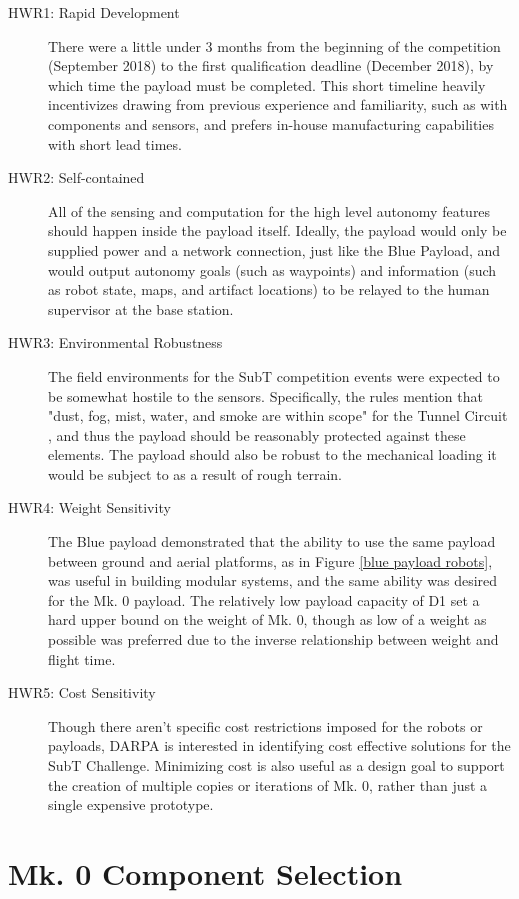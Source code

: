 \begin{description}
	\item[HWR1: Rapid Development] There were a little under 3 months from the beginning of the competition (September 2018) to the first qualification deadline (December 2018), by which time the payload must be completed. This short timeline heavily incentivizes drawing from previous experience and familiarity, such as with components and sensors, and prefers in-house manufacturing capabilities with short lead times.
	\item[HWR2: Self-contained] All of the sensing and computation for the high level autonomy features should happen inside the payload itself. Ideally, the payload would only be supplied power and a network connection, just like the Blue Payload, and would output autonomy goals (such as waypoints) and information (such as robot state, maps, and artifact locations) to be relayed to the human supervisor at the base station.
	\item[HWR3: Environmental Robustness] The field environments for the SubT competition events were expected to be somewhat hostile to the sensors. Specifically, the rules mention that "dust, fog, mist, water, and smoke are within scope" for the Tunnel Circuit \cite{tunnel_rules}, and thus the payload should be reasonably protected against these elements. The payload should also be robust to the mechanical loading it would be subject to as a result of rough terrain.
	\item[HWR4: Weight Sensitivity] The Blue payload demonstrated that the ability to use the same payload between ground and aerial platforms, as in Figure \ref{blue payload robots}, was useful in building modular systems, and the same ability was desired for the Mk. 0 payload. The relatively low payload capacity of D1 set a hard upper bound on the weight of Mk. 0, though as low of a weight as possible was preferred due to the inverse relationship between weight and flight time.	
	\item[HWR5: Cost Sensitivity] Though there aren't specific cost restrictions imposed for the robots or payloads, DARPA is interested in identifying cost effective solutions for the SubT Challenge. Minimizing cost is also useful as a design goal to support the creation of multiple copies or iterations of Mk. 0, rather than just a single expensive prototype.
\end{description}

\section{Mk. 0 Component Selection}

